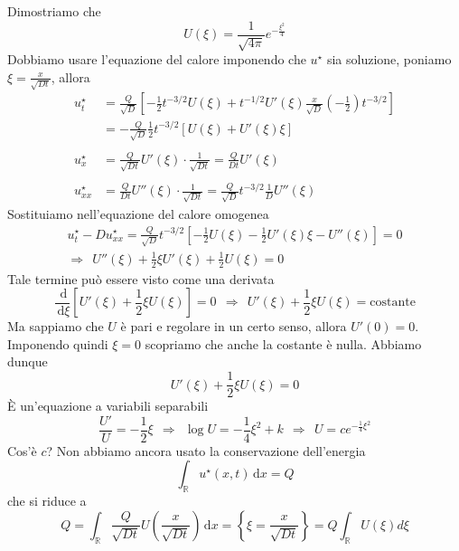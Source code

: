 \documentclass[10pt,a4paper,twoside,openright]{book}
\newcommand{\de}{\,\mathrm d}
\newcommand{\dx}{\de x}
\newcommand{\dxi}{\de \xi}
\begin{document}
Dimostriamo che
\begin{equation*}
U(\xi) =\frac{1}{\sqrt{4\pi }} e^{-\frac{\xi ^{2}}{4}}
\end{equation*}
Dobbiamo usare l'equazione del calore imponendo che $u^{\star }$ sia soluzione, poniamo $\xi =\frac{x}{\sqrt{Dt}}$, allora
\begin{align*}
u^{\star }_{t} & =\frac{Q}{\sqrt{D}}\left[ -\frac{1}{2} t^{-3/2} U(\xi) +t^{-1/2} U'(\xi)\frac{x}{\sqrt{D}}\left(-\frac{1}{2}\right) t^{-3/2}\right]\\
 & =-\frac{Q}{\sqrt{D}}\frac{1}{2} t^{-3/2}[ U(\xi) +U'(\xi) \xi ]\\
 & \\
u^{\star }_{x} & =\frac{Q}{\sqrt{Dt}} U'(\xi) \cdotp \frac{1}{\sqrt{Dt}} =\frac{Q}{Dt} U'(\xi)\\
 & \\
u^{\star }_{xx} & =\frac{Q}{Dt} U''(\xi) \cdotp \frac{1}{\sqrt{Dt}} =\frac{Q}{\sqrt{D}} t^{-3/2}\frac{1}{D} U''(\xi)
\end{align*}
Sostituiamo nell'equazione del calore omogenea
\begin{gather*}
u^{\star }_{t} -Du^{\star }_{xx} =\frac{Q}{\sqrt{D}} t^{-3/2}\left[ -\frac{1}{2} U(\xi) -\frac{1}{2} U'(\xi) \xi -U''(\xi)\right] =0\\
\Rightarrow \ \ U''(\xi) +\frac{1}{2} \xi U'(\xi) +\frac{1}{2} U(\xi) =0
\end{gather*}
Tale termine può essere visto come una derivata
\begin{equation*}
\frac{\de}{\dxi }\left[ U'(\xi) +\frac{1}{2} \xi U(\xi)\right] =0\ \ \Rightarrow \ \ U'(\xi) +\frac{1}{2} \xi U(\xi) =\text{costante}
\end{equation*}
Ma sappiamo che $U$ è pari e regolare in un certo senso, allora $U'(0) =0$. Imponendo quindi $\xi =0$ scopriamo che anche la costante è nulla. Abbiamo dunque
\begin{equation*}
U'(\xi) +\frac{1}{2} \xi U(\xi) =0
\end{equation*}
È un'equazione a variabili separabili
\begin{equation*}
\frac{U'}{U} =-\frac{1}{2} \xi \ \ \Rightarrow \ \ \log U=-\frac{1}{4} \xi ^{2} +k\ \ \Rightarrow \ \ U=ce^{-\frac{1}{4} \xi ^{2}}
\end{equation*}
Cos'è $c$? Non abbiamo ancora usato la conservazione dell'energia
\begin{equation*}
\int _{\mathbb{R}} u^{\star }(x,t) \dx=Q
\end{equation*}
che si riduce a
\begin{equation*}
Q = \int _{\mathbb{R}}\frac{Q}{\sqrt{Dt}} U\left(\frac{x}{\sqrt{Dt}}\right) \dx=\left\{\xi=\frac{x}{\sqrt{Dt}}\right\} = Q\int _{\mathbb{R}} U(\xi) d\xi
\end{equation*}
\end{document}
